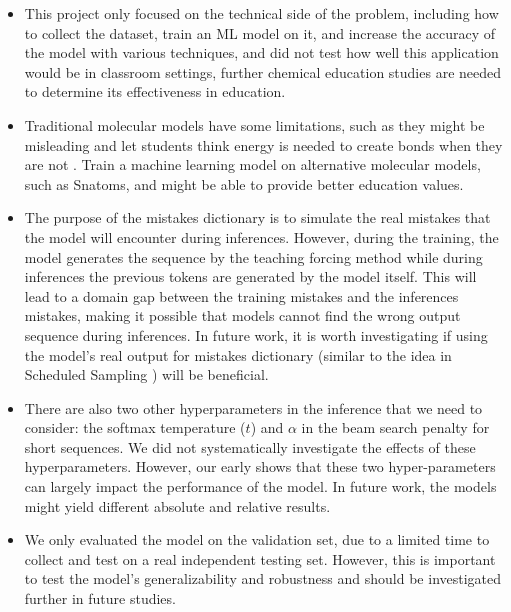 \documentclass[12pt]{article}
\begin{document}
\begin{itemize}
\item This project only focused on the technical side of the problem, including how to collect the dataset, train an ML model on it, and increase the accuracy of the model with various techniques, and did not test how well this application would be in classroom settings, further chemical education studies are needed to determine its effectiveness in education. 

\item Traditional molecular models have some limitations, such as they might be misleading and let students think energy is needed to create bonds when they are not \autocite{snatoms}. Train a machine learning model on alternative molecular models, such as Snatoms\autocite{snatoms}, and might be able to provide better education values. 

\item  The purpose of the mistakes dictionary is to simulate the real mistakes that the model will encounter during inferences. However, during the training, the model generates the sequence by the teaching forcing method while during inferences the previous tokens are generated by the model itself. This will lead to a domain gap between the training mistakes and the inferences mistakes, making it possible that models cannot find the wrong output sequence during inferences. In future work, it is worth investigating if using the model's real output for mistakes dictionary (similar to the idea in Scheduled Sampling \autocite{bengio_scheduled_2015}) will be beneficial. 

\item There are also two other hyperparameters in the inference that we need to consider: the softmax temperature ($t$) and $\alpha$ in the beam search penalty for short sequences. We did not systematically investigate the effects of these hyperparameters. However, our early shows that these two hyper-parameters can largely impact the performance of the model. In future work, the models might yield different absolute and relative results.     

\item We only evaluated the model on the validation set, due to a limited time to collect and test on a real independent testing set. However, this is important to test the model's generalizability and robustness and should be investigated further in future studies. 

\end{itemize}
\end{document}
